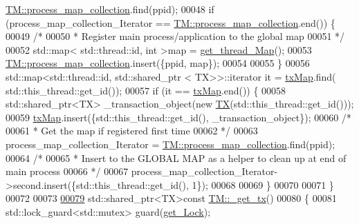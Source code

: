 \begin{DoxyCode}
      \hyperlink{class_t_m_a81c3bd28ad2343a620fa070f8ac186ca_a81c3bd28ad2343a620fa070f8ac186ca}{TM::process\_map\_collection}.find(ppid);
00048     \textcolor{keywordflow}{if} (process\_map\_collection\_Iterator == \hyperlink{class_t_m_a81c3bd28ad2343a620fa070f8ac186ca_a81c3bd28ad2343a620fa070f8ac186ca}{TM::process\_map\_collection}.end()) \{
00049         \textcolor{comment}{/*}
00050 \textcolor{comment}{         * Register main process/application to the global map}
00051 \textcolor{comment}{         */}
00052         std::map< std::thread::id, int >map = \hyperlink{class_t_m_afb8bc9f42fe06c52747beb7f4c46915c_afb8bc9f42fe06c52747beb7f4c46915c}{get\_thread\_Map}();
00053         \hyperlink{class_t_m_a81c3bd28ad2343a620fa070f8ac186ca_a81c3bd28ad2343a620fa070f8ac186ca}{TM::process\_map\_collection}.insert(\{ppid, map\});
00054 
00055     \}
00056     std::map<std::thread::id, std::shared\_ptr < TX>>::iterator it = \hyperlink{class_t_m_a0333dfa193ea99d7626de74a2b932e9b_a0333dfa193ea99d7626de74a2b932e9b}{txMap}.find(
      std::this\_thread::get\_id());
00057     \textcolor{keywordflow}{if} (it == \hyperlink{class_t_m_a0333dfa193ea99d7626de74a2b932e9b_a0333dfa193ea99d7626de74a2b932e9b}{txMap}.end()) \{
00058         std::shared\_ptr<TX> \_transaction\_object(\textcolor{keyword}{new} \hyperlink{class_t_x}{TX}(std::this\_thread::get\_id()));
00059         \hyperlink{class_t_m_a0333dfa193ea99d7626de74a2b932e9b_a0333dfa193ea99d7626de74a2b932e9b}{txMap}.insert(\{std::this\_thread::get\_id(), \_transaction\_object\});
00060         \textcolor{comment}{/*}
00061 \textcolor{comment}{         * Get the map if registered first time}
00062 \textcolor{comment}{         */}
00063         process\_map\_collection\_Iterator = \hyperlink{class_t_m_a81c3bd28ad2343a620fa070f8ac186ca_a81c3bd28ad2343a620fa070f8ac186ca}{TM::process\_map\_collection}.find(ppid);
00064         \textcolor{comment}{/*}
00065 \textcolor{comment}{         * Insert to the GLOBAL MAP as a helper to clean up at end of main process }
00066 \textcolor{comment}{         */}
00067         process\_map\_collection\_Iterator->second.insert(\{std::this\_thread::get\_id(), 1\});
00068 
00069     \}
00070 
00071 \}
00072 
00073 
\hypertarget{_t_m_8cpp_source.tex_l00079}{}\hyperlink{class_t_m_a41cb0226cc4080c931651b13f74a0075_a41cb0226cc4080c931651b13f74a0075}{00079} std::shared\_ptr<TX>\textcolor{keyword}{const} \hyperlink{class_t_m_a41cb0226cc4080c931651b13f74a0075_a41cb0226cc4080c931651b13f74a0075}{TM::\_get\_tx}()
00080 \{
00081     std::lock\_guard<std::mutex> guard(\hyperlink{class_t_m_a123bc5aa0766a7b909bebc54a429e5b0_a123bc5aa0766a7b909bebc54a429e5b0}{get\_Lock});

\end{DoxyCode}
